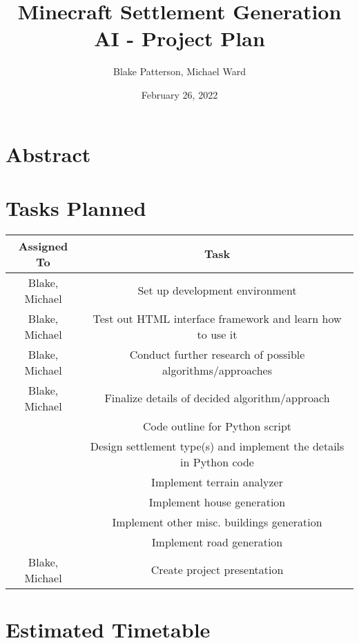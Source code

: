 \documentclass[11pt, oneside]{article}
\begin{document}
\title{Minecraft Settlement Generation AI - Project Plan}
\author{Blake Patterson, Michael Ward}
\date{February 26, 2022}
\maketitle

\newpage
\tableofcontents
\newpage
{}


\section{Abstract}
\label{abstract}

\newpage


\section{Tasks Planned}
\label{tasksPlanned}

\begin{center}
\begin{tabular}{| c | c |} 
 	\hline
 	 Assigned To & Task \\ [0.5ex] 
 	\hline\hline
	Blake, Michael & Set up development environment \\
	\hline
	Blake, Michael & Test out HTML interface framework and learn how to use it \\
	\hline
	Blake, Michael & Conduct further research of possible algorithms/approaches \\
	\hline
	Blake, Michael & Finalize details of decided algorithm/approach \\
	\hline
	 & Code outline for Python script \\
	\hline
	 & Design settlement type(s) and implement the details in Python code \\
	\hline
	 & Implement terrain analyzer \\
	\hline
	 & Implement house generation \\
	\hline
	 & Implement other misc. buildings generation \\
	\hline
	 & Implement road generation \\
	\hline
	Blake, Michael & Create project presentation \\
	\hline
\end{tabular}
\end{center}

\newpage


\section{Estimated Timetable}
\label{estimatedTimetable}
\end{document}
